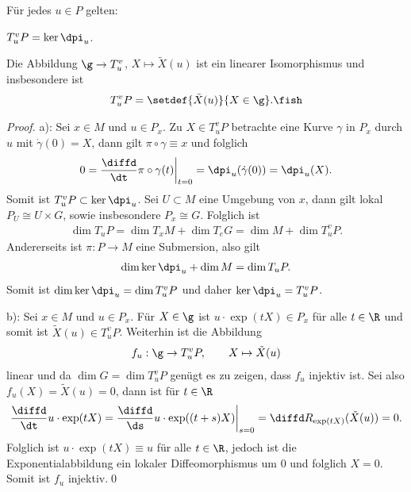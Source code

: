 \documentclass[%
	paper=a5,%
	fleqn,%
	DIV=18,%
	BCOR=0mm,
	fontsize=11pt,
	titlepage=false,%
	bibliography=totoc,
	DIV=18,%
	twoside=true,
	pdftitle=Riemannsche Geometrie,
	pdfauthor=Uwe Semmelmann,
	numbers=noendperiod]%
	{scrbook}
\begin{document}
\begin{prop}
Für jedes $u\in P$ gelten:
\begin{propenum}
\item $T^v_uP = \ker\dpi_u$.
\item Die Abbildung $\g\to T^v_u$, $X\mapsto \tilde{X}(u)$
ist ein linearer Isomorphismus und insbesondere ist
\begin{align*}
T^v_uP = \setdef{\tilde{X}(u)}{X\in \g}.\fish
\end{align*}
\end{propenum}
\end{prop}
\begin{proof}
a): Sei $x\in M$ und $u\in P_x$. Zu $X\in T^v_uP$ betrachte eine Kurve
$\gamma$ in $P_x$ durch $u$ mit $\dot{\gamma}(0) = X$, dann gilt
$\pi\circ\gamma \equiv x$ und folglich
\begin{align*}
0 = \frac{\diffd}{\dt}\pi\circ\gamma(t) \bigg|_{t=0}
= \dpi_u(\dot{\gamma}(0)) = \dpi_u(X).
\end{align*}
Somit ist $T^v_uP \subset \ker \dpi_u$. Sei $U\subset M$ eine Umgebung von
$x$, dann gilt lokal $P_U \cong U\times G$, sowie insbesondere $P_x\cong G$.
Folglich ist 
\begin{align*}
\dim T_uP = \dim T_x M + \dim T_e G = \dim M + \dim T^v_uP.
\end{align*}
Andererseits ist $\pi: P\to M$ eine Submersion, also gilt 
\begin{align*}
\dim \ker \dpi_u + \dim M = \dim T_uP.
\end{align*}
Somit ist $\dim \ker \dpi_u = \dim T^v_uP$ und daher $\ker\dpi_u = T^v_uP$.

b): Sei $x\in M$ und $u\in P_x$. Für $X\in\g$ ist $u\cdot \exp(tX) \in P_x$ für
alle $t\in\R$ und somit ist $\tilde{X}(u) \in T^v_uP$. Weiterhin ist die
Abbildung
\begin{align*}
f_u : \g\to T^v_uP,\qquad X\mapsto \tilde{X}(u) 
\end{align*}
linear und da $\dim G = \dim T^v_uP$ genügt es zu zeigen, dass $f_u$
injektiv ist. Sei also $f_u(X) = \tilde{X}(u) = 0$, dann ist für $t\in\R$
\begin{align*}
\frac{\diffd}{\dt} u\cdot \exp(tX)
=
\frac{\diffd}{\ds} u\cdot \exp((t+s)X)\bigg|_{s=0}
=
\diffd R_{\exp(tX)}(\tilde{X}(u)) = 0.
\end{align*}
Folglich ist $u\cdot \exp(tX) \equiv u$ für alle $t\in\R$, jedoch ist die
Exponentialabbildung ein lokaler Diffeomorphismus um $0$ und folglich $X=0$.
Somit ist $f_u$ injektiv.\qed
\end{proof}
\end{document}
